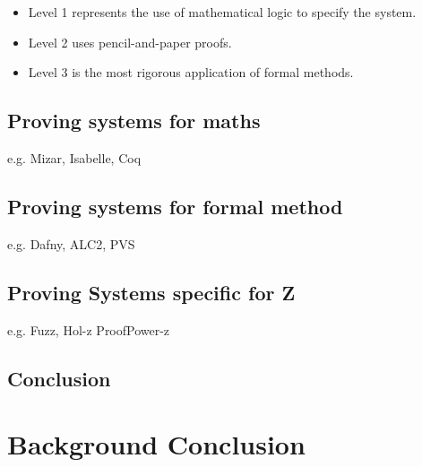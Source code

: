 \begin{itemize}
\item Level 1 represents the use of mathematical logic to specify the system.
\item Level 2 uses pencil-and-paper proofs.
\item Level 3 is the most rigorous application of formal methods.

\end{itemize}

\subsection{Proving systems for maths}

e.g. Mizar, Isabelle, Coq

\subsection{Proving systems for formal method}

e.g. Dafny, ALC2, PVS

\subsection{Proving Systems specific for Z}

e.g. Fuzz, Hol-z ProofPower-z

\subsection{Conclusion}

\section{Background Conclusion}